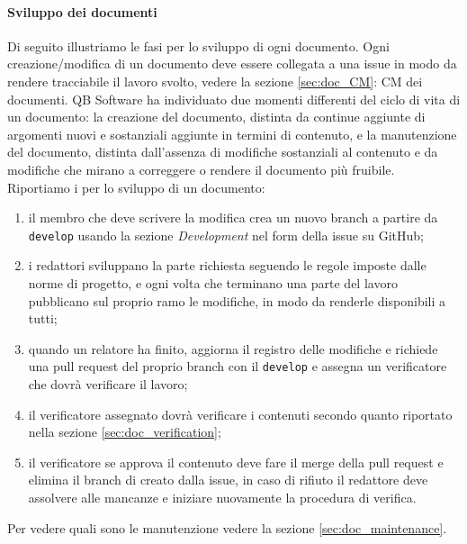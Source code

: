         \paragraph{Sviluppo dei documenti} \label{sec:doc_dev}
            Di seguito illustriamo le fasi per lo sviluppo di ogni documento. Ogni creazione/modifica di un documento deve essere collegata a una issue in modo da rendere tracciabile il lavoro svolto, vedere la sezione \ref{sec:doc_CM}: CM dei documenti. QB Software ha individuato due momenti differenti del ciclo di vita di un documento: la creazione del documento, distinta da continue aggiunte di argomenti nuovi e sostanziali aggiunte in termini di contenuto, e la manutenzione del documento, distinta dall'assenza di modifiche sostanziali al contenuto e da modifiche che mirano a correggere o rendere il documento più fruibile.
            \\
            Riportiamo i per lo sviluppo di un documento:
            \begin{enumerate}
                \item il membro che deve scrivere la modifica crea un nuovo branch a partire da \verb|develop| usando la sezione \emph{Development} nel form della issue su GitHub;
                \item i redattori sviluppano la parte richiesta seguendo le regole imposte dalle norme di progetto, e ogni volta che terminano una parte del lavoro pubblicano sul proprio ramo le modifiche, in modo da renderle disponibili a tutti;
                \item quando un relatore ha finito, aggiorna il registro delle modifiche e richiede una pull request del proprio branch con il \verb|develop| e assegna un verificatore che dovrà verificare il lavoro;
                \item il verificatore assegnato dovrà verificare i contenuti secondo quanto riportato nella sezione \ref{sec:doc_verification};
                \item il verificatore se approva il contenuto deve fare il merge della pull request e elimina il branch di creato dalla issue, in caso di rifiuto il redattore deve assolvere alle mancanze e iniziare nuovamente la procedura di verifica.
            \end{enumerate}
            Per vedere quali sono le manutenzione vedere la sezione \ref{sec:doc_maintenance}.

